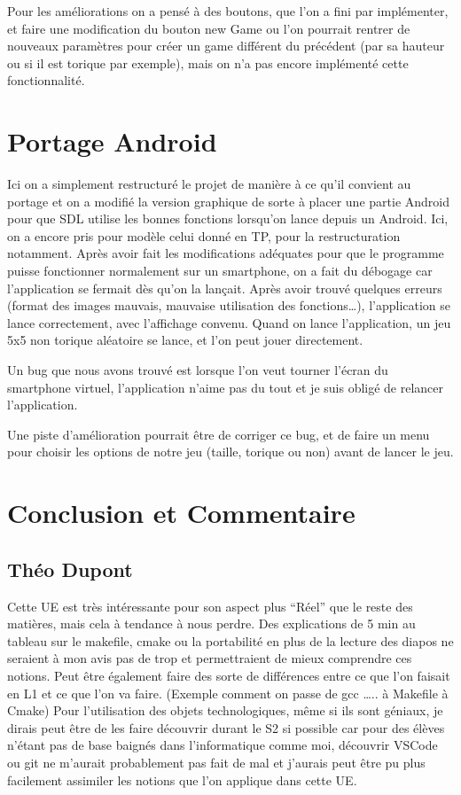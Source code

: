 ﻿\documentclass[12pt]{article}
\begin{document}
Pour les améliorations on a pensé à des boutons, que l’on a fini par implémenter, et faire une modification du bouton new Game ou l’on pourrait rentrer de nouveaux paramètres pour créer un game différent du précédent (par sa hauteur ou si il est torique par exemple), mais on n’a pas encore implémenté cette fonctionnalité.




\section{Portage Android}


Ici on a simplement restructuré le projet de manière à ce qu’il convient au portage et on a modifié la version graphique de sorte à placer une partie Android pour que SDL utilise les bonnes fonctions lorsqu’on lance depuis un Android.
Ici, on a encore pris pour modèle celui donné en TP, pour la restructuration notamment.
Après avoir fait les modifications adéquates pour que le programme puisse fonctionner normalement sur un smartphone, on a fait du débogage car l’application se fermait dès qu’on la lançait. Après avoir trouvé quelques erreurs (format des images mauvais, mauvaise utilisation des fonctions…), l’application se lance correctement, avec l’affichage convenu.
Quand on lance l’application, un jeu 5x5 non torique aléatoire se lance, et l’on peut jouer directement.


Un bug que nous avons trouvé est lorsque l’on veut tourner l’écran du smartphone virtuel, l’application n’aime pas du tout et je suis obligé de relancer l’application.


Une piste d’amélioration pourrait être de corriger ce bug, et de faire un menu pour choisir les options de notre jeu (taille, torique ou non) avant de lancer le jeu.


\section{Conclusion et Commentaire}


\subsection{Théo Dupont}


Cette UE est très intéressante pour son aspect plus “Réel” que le reste des matières, mais cela à tendance à nous perdre. Des explications de 5 min au tableau sur le makefile, cmake ou la portabilité en plus de la lecture des diapos ne seraient à mon avis pas de trop et permettraient de mieux comprendre ces notions. Peut être également faire des sorte de différences entre ce que l’on faisait en L1 et ce que l’on va faire. (Exemple comment on passe de gcc ….. à Makefile à Cmake)
Pour l’utilisation des objets technologiques, même si ils sont géniaux, je dirais peut être de les faire découvrir durant le S2 si possible car pour des élèves n’étant pas de base baignés dans l’informatique comme moi, découvrir VSCode ou git ne m’aurait probablement pas fait de mal et j’aurais peut être pu plus facilement assimiler les notions que l’on applique dans cette UE.
\end{document}
